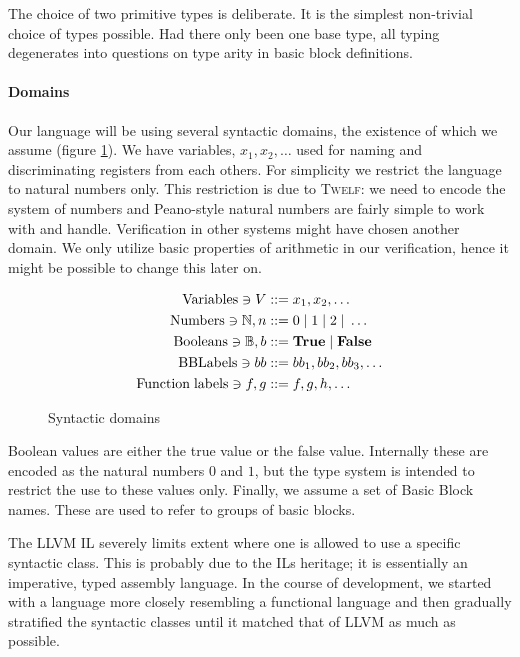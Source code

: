 \documentclass[a4paper, oneside, 10pt, draft]{memoir}
\newcommand{\twelf}{\textsc{Twelf}}
\begin{document}
The choice of two primitive types is deliberate. It is the simplest
non-trivial choice of types possible. Had there only been one base
type, all typing degenerates into questions on type arity in basic
block definitions.

\newcommand{\numbers}{\mathrm{Numbers}}
\newcommand{\booleans}{\mathrm{Booleans}}
\newcommand{\funlabels}{\mathrm{Function\; labels}}
\newcommand{\nat}{n}
\newcommand{\bool}{b}
\newcommand{\BB}{\mathbb{B}}
\newcommand{\btrue}{\mathbf{True}}
\newcommand{\bfalse}{\mathbf{False}}

\paragraph{Domains}

Our language will be using several syntactic domains, the existence of
which we assume (figure \ref{fig:syntactic-domains}). We have
variables, $x_1, x_2, \dotsc$ used for naming and discriminating
registers from each others. For simplicity we restrict the language to
natural numbers only. This restriction is due to \twelf{}: we need to
encode the system of numbers and Peano-style natural numbers are
fairly simple to work with and handle. Verification in other systems
might have chosen another domain. We only utilize basic properties of
arithmetic in our verification, hence it might be possible to change
this later on.
\begin{figure}
  \begin{align*}
    \variables \ni V & ::= x_1, x_2, \dotsc \\
    \numbers \ni \NN, \nat & ::= 0 \bor 1 \bor 2 \bor \dotsc\\
    \booleans \ni \BB, \bool & ::= \btrue \bor \bfalse \\
    \BBlabels \ni bb & ::= bb_1, bb_2, bb_3, \dotsc \\
    \funlabels \ni f,g & ::= f,g,h,\dotsc
  \end{align*}
  \caption{Syntactic domains}
  \label{fig:syntactic-domains}
\end{figure}

Boolean values are either the true value or the false
value. Internally these are encoded as the natural numbers $0$ and
$1$, but the type system is intended to restrict the use to these
values only. Finally, we assume a set of Basic Block names. These are used to refer
to groups of basic blocks.

The LLVM IL severely limits extent where one is allowed to use a
specific syntactic class. This is probably due to the ILs heritage; it
is essentially an imperative, typed assembly language. In the course
of development, we started with a language more closely resembling a
functional language and then gradually stratified the syntactic
classes until it matched that of LLVM as much as possible.
\end{document}
